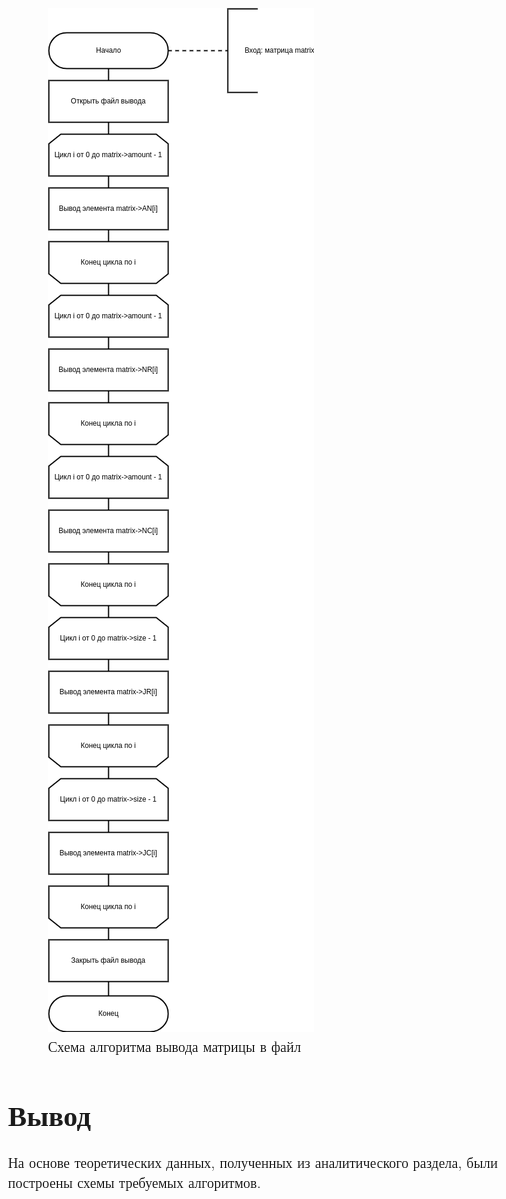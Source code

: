 \begin{figure}[H]
	\begin{center}
		\includegraphics[scale=0.4]{img/output.png}
	\end{center}
	\captionsetup{justification=centering}
	\caption{Схема алгоритма вывода матрицы в файл}
	\label{img:output}
\end{figure}

\section*{Вывод}

На основе теоретических данных, полученных из аналитического раздела,
были построены схемы требуемых алгоритмов.
